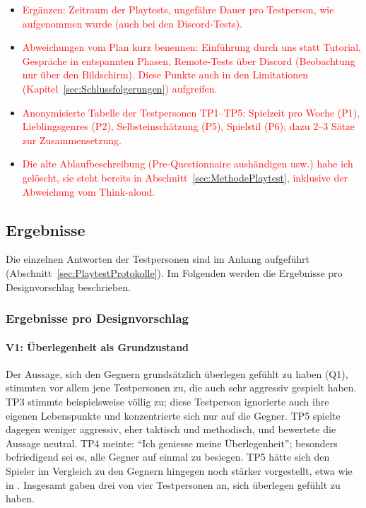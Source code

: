 \documentclass[../Main.tex]{subfiles}
\begin{document}
\begin{itemize}[leftmargin=1.5cm]
    \item \textcolor{red}{Ergänzen: Zeitraum der Playtests, ungefähre Dauer pro Testperson, wie aufgenommen wurde (auch bei den Discord-Tests).}
    \item \textcolor{red}{Abweichungen vom Plan kurz benennen: Einführung durch uns statt Tutorial, Gespräche in entspannten Phasen, Remote-Tests über Discord (Beobachtung nur über den Bildschirm). Diese Punkte auch in den Limitationen (Kapitel~\ref{sec:Schlussfolgerungen}) aufgreifen.}
    \item \textcolor{red}{Anonymisierte Tabelle der Testpersonen TP1--TP5: Spielzeit pro Woche (P1), Lieblingsgenres (P2), Selbsteinschätzung (P5), Spielstil (P6); dazu 2--3 Sätze zur Zusammensetzung.}
    \item \textcolor{red}{Die alte Ablaufbeschreibung (Pre-Questionnaire aushändigen usw.) habe ich gelöscht, sie steht bereits in Abschnitt~\ref{sec:MethodePlaytest}, inklusive der Abweichung vom Think-aloud.}
\end{itemize}

\subsection{Ergebnisse}

Die einzelnen Antworten der Testpersonen sind im Anhang aufgeführt (Abschnitt~\ref{sec:PlaytestProtokolle}). Im Folgenden werden die Ergebnisse pro Designvorschlag beschrieben.

\subsubsection{Ergebnisse pro Designvorschlag} \label{sec:ErgVorschlag}

\paragraph{V1: Überlegenheit als Grundzustand}
Der Aussage, sich den Gegnern grundsätzlich überlegen gefühlt zu haben (Q1), stimmten vor allem jene Testpersonen zu, die auch sehr aggressiv gespielt haben. TP3 stimmte beispielsweise völlig zu; diese Testperson ignorierte auch ihre eigenen Lebenspunkte und konzentrierte sich nur auf die Gegner. TP5 spielte dagegen weniger aggressiv, eher taktisch und methodisch, und bewertete die Aussage neutral. TP4 meinte: \enquote{Ich geniesse meine Überlegenheit}; besonders befriedigend sei es, alle Gegner auf einmal zu besiegen. TP5 hätte sich den Spieler im Vergleich zu den Gegnern hingegen noch stärker vorgestellt, etwa wie in . Insgesamt gaben drei von vier Testpersonen an, sich überlegen gefühlt zu haben.
\end{document}
